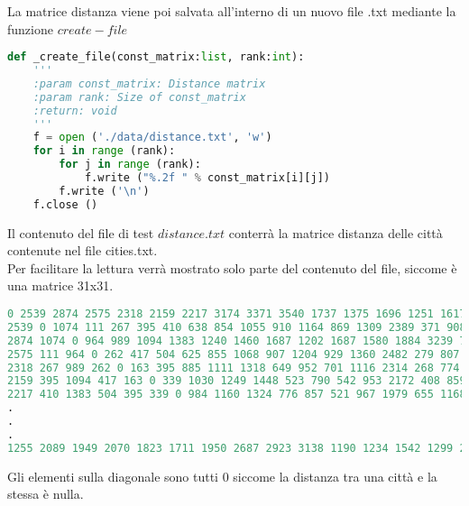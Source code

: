 \documentclass[a4paper,12pt]{report}
\begin{document}
La matrice distanza viene poi salvata all'interno di un nuovo file .txt mediante la funzione $create-file$
\begin{lstlisting}[language=Python]
def _create_file(const_matrix:list, rank:int):
    '''
    :param const_matrix: Distance matrix
    :param rank: Size of const_matrix
    :return: void
    '''
    f = open ('./data/distance.txt', 'w')
    for i in range (rank):
        for j in range (rank):
            f.write ("%.2f " % const_matrix[i][j])
        f.write ('\n')
    f.close ()
\end{lstlisting}
Il contenuto del file di test $distance.txt$ conterrà la matrice distanza delle città contenute nel file cities.txt.\\
Per facilitare la lettura verrà mostrato solo parte del contenuto del file, siccome è una matrice 31x31.
\begin{lstlisting}[language=Python]
0 2539 2874 2575 2318 2159 2217 3174 3371 3540 1737 1375 1696 1251 1617 2493 2617 2758 2478 2387 2775 3023 2163 2204 2116 2313 1877 2214 1242 1561 1255 
2539 0 1074 111 267 395 410 638 854 1055 910 1164 869 1309 2389 371 908 1136 908 1264 1572 1732 629 1060 1350 1897 2050 2290 1511 1739 2089 
2874 1074 0 964 989 1094 1383 1240 1460 1687 1202 1687 1580 1884 3239 731 267 171 398 602 612 692 820 681 879 1209 1592 1668 1636 1515 1949 
2575 111 964 0 262 417 504 625 855 1068 907 1204 929 1360 2482 279 807 1032 816 1180 1474 1628 582 989 1284 1823 1998 2226 1510 1705 2070 
2318 267 989 262 0 163 395 885 1111 1318 649 952 701 1116 2314 268 774 1013 737 1060 1411 1597 378 832 1112 1667 1792 2045 1251 1473 1823 
2159 395 1094 417 163 0 339 1030 1249 1448 523 790 542 953 2172 408 859 1097 798 1080 1462 1664 367 831 1089 1649 1729 2003 1119 1383 1711 
2217 410 1383 504 395 339 0 984 1160 1324 776 857 521 967 1979 655 1168 1407 1123 1418 1793 1987 705 1169 1423 1982 2034 2323 1324 1662 1950 
.
.
.
1255 2089 1949 2070 1823 1711 1950 2687 2923 3138 1190 1234 1542 1299 2505 1868 1741 1796 1603 1365 1665 1894 1503 1289 1076 1093 624 961 642 434 0 
\end{lstlisting}
Gli elementi sulla diagonale sono tutti 0 siccome la distanza tra una città e la stessa è nulla.
\end{document}
